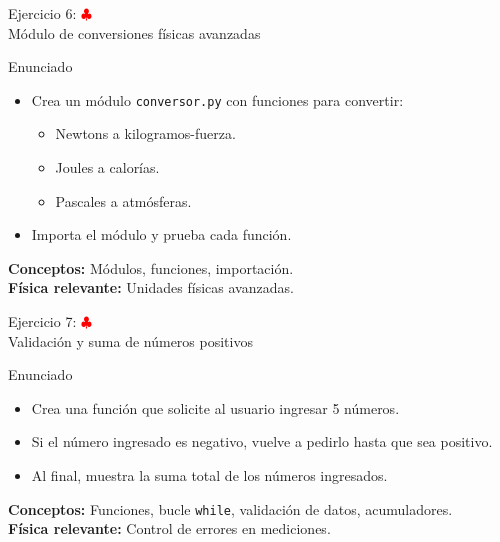 \documentclass[10pt]{beamer}
\begin{document}

\begin{frame}{Ejercicio 6: \hfill \textcolor{red}{$\clubsuit$} \\ Módulo de conversiones físicas avanzadas}
  \begin{block}{Enunciado}
    \begin{itemize}
      \item Crea un módulo \texttt{conversor.py} con funciones para convertir:
        \begin{itemize}
          \item Newtons a kilogramos-fuerza.
          \item Joules a calorías.
          \item Pascales a atmósferas.
        \end{itemize}
      \item Importa el módulo y prueba cada función.
    \end{itemize}
  \end{block}
  \textbf{Conceptos:} Módulos, funciones, importación.\\
  \textbf{Física relevante:} Unidades físicas avanzadas.
\end{frame}

\begin{frame}{Ejercicio 7: \hfill \textcolor{red}{$\clubsuit$} \\ Validación y suma de números positivos}
  \begin{block}{Enunciado}
    \begin{itemize}
      \item Crea una función que solicite al usuario ingresar 5 números.
      \item Si el número ingresado es negativo, vuelve a pedirlo hasta que sea positivo.
      \item Al final, muestra la suma total de los números ingresados.
    \end{itemize}
  \end{block}
  \textbf{Conceptos:} Funciones, bucle \texttt{while}, validación de datos, acumuladores.\\
  \textbf{Física relevante:} Control de errores en mediciones.
\end{frame}
\end{document}
